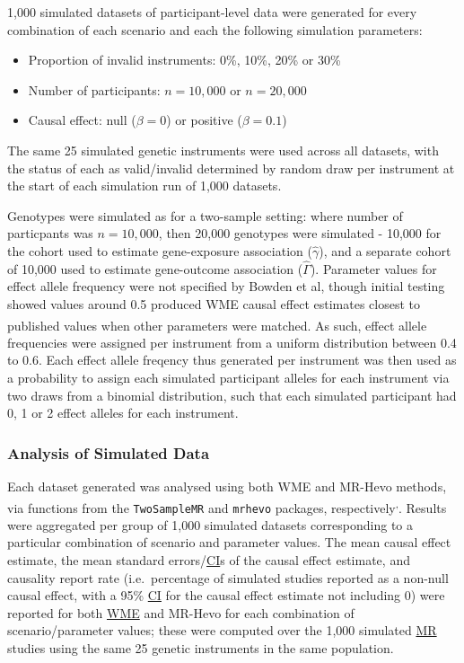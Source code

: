 \documentclass[
]{article}
\providecommand{\tightlist}{%
  \setlength{\itemsep}{0pt}\setlength{\parskip}{0pt}}
\begin{document}
1,000 simulated datasets of participant-level data were generated for every combination of each scenario and each the following simulation parameters:

\begin{itemize}
\tightlist
\item
  Proportion of invalid instruments: 0\%, 10\%, 20\% or 30\%
\item
  Number of participants: \(n = 10,000\) or \(n = 20,000\)
\item
  Causal effect: null (\(\beta = 0\)) or positive (\(\beta = 0.1\))
\end{itemize}

The same 25 simulated genetic instruments were used across all datasets, with the status of each as valid/invalid determined by random draw per instrument at the start of each simulation run of 1,000 datasets.

Genotypes were simulated as for a two-sample setting: where number of particpants was \(n = 10,000\), then 20,000 genotypes were simulated - 10,000 for the cohort used to estimate gene-exposure association (\(\hat{\gamma}\)), and a separate cohort of 10,000 used to estimate gene-outcome association (\(\hat{\Gamma}\)). Parameter values for effect allele frequency were not specified by Bowden et al, though initial testing showed values around 0.5 produced WME causal effect estimates closest to published values when other parameters were matched\textsuperscript{}. As such, effect allele frequencies were assigned per instrument from a uniform distribution between 0.4 to 0.6. Each effect allele freqency thus generated per instrument was then used as a probability to assign each simulated participant alleles for each instrument via two draws from a binomial distribution, such that each simulated participant had 0, 1 or 2 effect alleles for each instrument.

\subsubsection{Analysis of Simulated Data}\label{analysis-of-simulated-data}

Each dataset generated was analysed using both WME and MR-Hevo methods, via functions from the \texttt{TwoSampleMR} and \texttt{mrhevo} packages, respectively\textsuperscript{,}. Results were aggregated per group of 1,000 simulated datasets corresponding to a particular combination of scenario and parameter values. The mean causal effect estimate, the mean standard errors/\hyperref[acronyms_CI]{CI}s of the causal effect estimate, and causality report rate (i.e.~percentage of simulated studies reported as a non-null causal effect, with a 95\% \hyperref[acronyms_CI]{CI} for the causal effect estimate not including 0) were reported for both \hyperref[acronyms_WME]{WME} and MR-Hevo for each combination of scenario/parameter values; these were computed over the 1,000 simulated \hyperref[acronyms_MR]{MR} studies using the same 25 genetic instruments in the same population.
\end{document}

